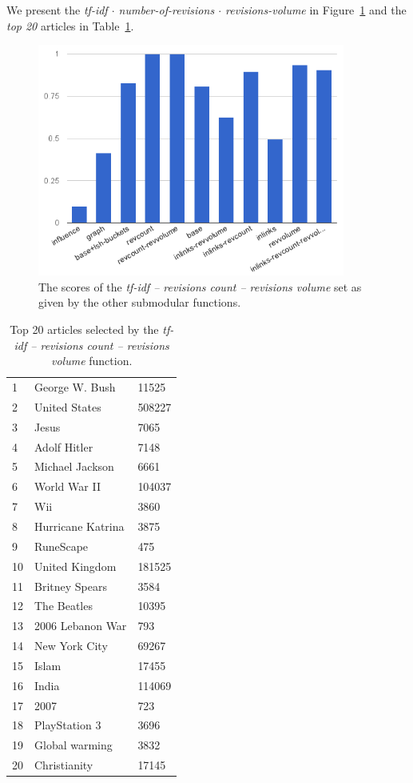 We present the \emph{tf-idf \(\cdot\) number-of-revisions \(\cdot\)
revisions-volume} in Figure~\ref{img:rc-rv} and the \emph{top 20} articles in
Table~\ref{tab:rc-rv}.
\begin{figure}
  \centering
  \includegraphics[width=0.9\textwidth,natwidth=555,natheight=419]{images/rc-rv.png}
  \caption{The scores of the \emph{tf-idf -- revisions count -- revisions
  volume} set as given by the other submodular functions.}
  \label{img:rc-rv}
\end{figure}
\begin{table}
    \centering
    \caption {Top 20 articles selected by the \emph{tf-idf -- revisions count
-- revisions volume} function.}
    \label{tab:rc-rv}
    \begin{tabular}{lll}
    1  & George W. Bush    & 11525  \\
    2  & United States     & 508227 \\
    3  & Jesus             & 7065   \\
    4  & Adolf Hitler      & 7148   \\
    5  & Michael Jackson   & 6661   \\
    6  & World War II      & 104037 \\
    7  & Wii               & 3860   \\
    8  & Hurricane Katrina & 3875   \\
    9  & RuneScape         & 475    \\
    10 & United Kingdom    & 181525 \\
    11 & Britney Spears    & 3584   \\
    12 & The Beatles       & 10395  \\
    13 & 2006 Lebanon War  & 793    \\
    14 & New York City     & 69267  \\
    15 & Islam             & 17455  \\
    16 & India             & 114069 \\
    17 & 2007              & 723    \\
    18 & PlayStation 3     & 3696   \\
    19 & Global warming    & 3832   \\
    20 & Christianity      & 17145  \\
    \end{tabular}
\end{table}

